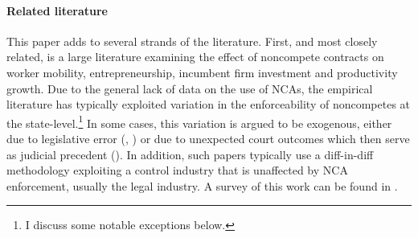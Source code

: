 \documentclass[ecta,nameyear,final]{econsocart}
\theoremstyle{plain}
\theoremstyle{remark}
\begin{document}
\paragraph{Related literature}

This paper adds to several strands of the literature. First, and most closely related, is a large literature examining the effect of noncompete contracts on worker mobility, entrepreneurship, incumbent firm investment and productivity growth. Due to the general lack of data on the use of NCAs, the empirical literature has typically exploited variation in the enforceability of noncompetes at the state-level.\footnote{I discuss some notable exceptions below.} In some cases, this variation is argued to be exogenous, either due to legislative error (\cite{marx_mobility_2009}, \cite{marx_regional_2015}) or due to unexpected court outcomes which then serve as judicial precedent (\cite{jeffers_impact_2018}). In addition, such papers typically use a diff-in-diff methodology exploiting a control industry that is unaffected by NCA enforcement, usually the legal industry. A survey of this work can be found in \cite{bishara_incomplete_2016}.
\end{document}
